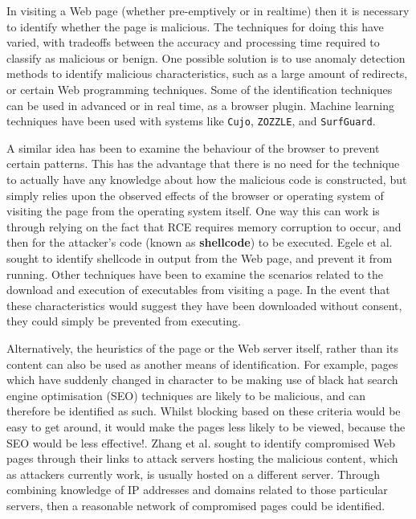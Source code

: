 \documentclass{acm_proc_article-sp}
\begin{document}
In visiting a Web page (whether pre-emptively or in realtime) then it is necessary to identify whether the page is malicious.  The techniques for doing this have varied, with tradeoffs between the accuracy and processing time required to classify as malicious or benign.  One possible solution is to use  anomaly detection methods to identify malicious characteristics, such as a large amount of redirects, or certain Web programming techniques\cite{cova2010detection}.  Some of the identification techniques can be used in advanced or in real time, as a browser plugin.  Machine learning techniques have been used with systems like \texttt{Cujo}\cite{rieck2010cujo}, \texttt{ZOZZLE}\cite{curtsinger2011zozzle}, and \texttt{SurfGuard}\cite{sachin2012surfguard}.  

A similar idea has been to examine the behaviour of the browser to prevent certain patterns.  This has the advantage that there is no need for the technique to actually have any knowledge about how the malicious code is constructed, but simply relies upon the observed effects of the browser or operating system of visiting the page from the operating system itself.  One way this can work is through relying on the fact that RCE requires memory corruption to occur, and then for the attacker's code (known as \textbf{shellcode}) to be executed.  Egele et al. sought to identify shellcode in output from the Web page, and prevent it from running\cite{egele2009mitigating}.  Other techniques have been to examine the scenarios related to the download and execution of executables from visiting a page.  In the event that these characteristics would suggest they have been downloaded without consent, they could simply be prevented from executing\cite{hsu2011browserguard}\cite{lu2010blade}.

Alternatively, the heuristics of the page or the Web server itself, rather than its content can also be used as another means of identification.  For example, pages which have suddenly changed in character to be making use of black hat search engine optimisation (SEO) techniques are likely to be malicious, and can therefore be identified as such.  Whilst blocking based on these criteria would be easy to get around, it would make the pages less likely to be viewed, because the SEO would be less effective!\cite{john}.  Zhang et al. sought to identify compromised Web pages through their links to attack servers hosting the malicious content, which as attackers currently work, is usually hosted on a different server.  Through combining knowledge of IP addresses and domains related to those particular servers, then a reasonable network of compromised pages could be identified\cite{zhang2011arrow}.
\end{document}
